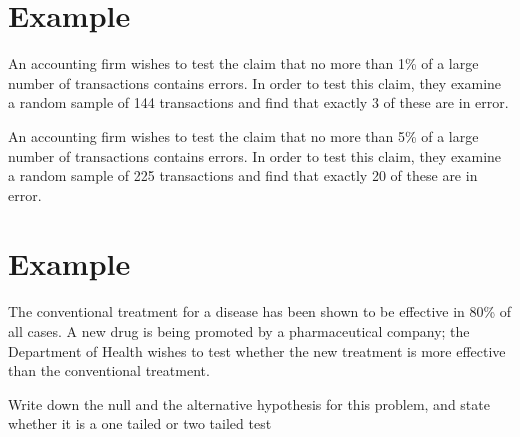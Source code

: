 \documentclass[a4paper,12pt]{article}
\begin{document}
\section{Example}

An accounting firm wishes to test the claim that no more than 1\% of a large
number of transactions contains errors. In order to test this claim, they
examine a random sample of 144 transactions and find that exactly 3 of
these are in error.

An accounting firm wishes to test the claim that no more than 5\% of a large
number of transactions contains errors. In order to test this claim, they examine a
random sample of 225 transactions and find that exactly 20 of these are in error.

\section{Example}


The conventional treatment for a disease has been shown to be effective in
80\% of all cases. A new drug is being promoted by a pharmaceutical
company; the Department of Health wishes to test whether the new treatment
is more effective than the conventional treatment.

Write down the null and the alternative hypothesis for this problem, and state whether it is a one tailed or two tailed test
\end{document}
